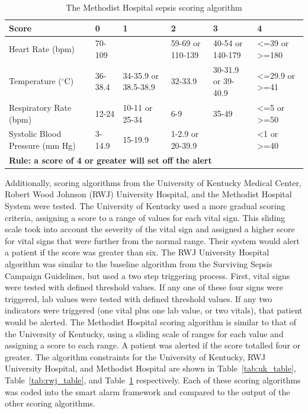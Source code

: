 \documentclass{sig-alternate}
\begin{document}
\begin{table}
\renewcommand{\arraystretch}{1.5}
  \begin{tabular}{| l | l | l | l | l | l |}
\hline

{\bf Score} & {\bf 0} & {\bf 1} & {\bf 2} & {\bf 3} & {\bf 4}\\ \hline
Heart Rate (bpm) & 70-109 & & 59-69 or 110-139 & 40-54 or 140-179 & <=39 or >=180\\ \hline
Temperature ($^\circ$C) & 36-38.4 & 34-35.9 or 38.5-38.9 & 32-33.9 & 30-31.9 or 39-40.9 & <=29.9 or >=41\\ \hline
Respiratory Rate (bpm) & 12-24 & 10-11 or 25-34 & 6-9 & 35-49 & <=5 or >=50\\ \hline
Systolic Blood Pressure (mm Hg) & 3-14.9 & 15-19.9 & 1-2.9 or 20-39.9 & & <1 or >=40\\ \hline
 \multicolumn{6}{|l|}{\bf Rule: a score of 4 or greater will set off the alert} \\ \hline
 \end{tabular}
	\caption{The Methodist Hospital sepsis scoring algorithm}
  \label{tab:mh_table}
\end{table}

Additionally, scoring algorithms from the University of Kentucky Medical Center, Robert Wood Johnson (RWJ) University Hospital, and the Methodist Hospital System were tested.  The University of Kentucky used a more gradual scoring criteria, assigning a score to a range of values for each vital sign.  This sliding scale took into account the severity of the vital sign and assigned a higher score for vital signs that were further from the normal range.  Their system would alert a patient if the score was greater than six.  The RWJ University Hospital algorithm was similar to the baseline algorithm from the Surviving Sepsis Campaign Guidelines, but used a two step triggering process.  First, vital signs were tested with defined threshold values.  If any one of these four signs were triggered, lab values were tested with defined threshold values.  If any two indicators were triggered (one vital plus one lab value, or two vitals), that patient would be alerted.  The Methodist Hospital scoring algorithm is similar to that of the University of Kentucky, using a sliding scale of ranges for each value and assigning a score to each range.  A patient was alerted if the score totalled four or greater.  The algorithm constraints for the University of Kentucky, RWJ University Hospital, and Methodist Hospital are shown in Table~\ref{tab:uk_table}, Table~\ref{tab:rwj_table}, and Table~\ref{tab:mh_table} respectively.  Each of these scoring algorithms was coded into the smart alarm framework and compared to the output of the other scoring algorithms.
\end{document}
